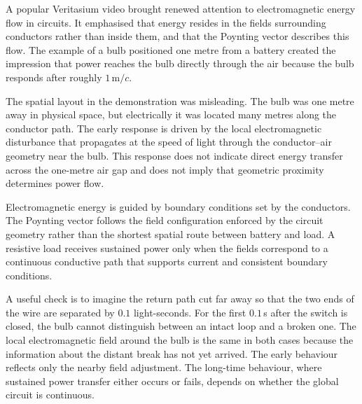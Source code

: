 \begin{commentary}
A popular Veritasium video brought renewed attention to electromagnetic energy flow in circuits. It emphasised that energy resides in the fields surrounding conductors rather than inside them, and that the Poynting vector describes this flow. The example of a bulb positioned one metre from a battery created the impression that power reaches the bulb directly through the air because the bulb responds after roughly $1\,\mathrm{m}/c$.

The spatial layout in the demonstration was misleading. The bulb was one metre away in physical space, but electrically it was located many metres along the conductor path. The early response is driven by the local electromagnetic disturbance that propagates at the speed of light through the conductor–air geometry near the bulb. This response does not indicate direct energy transfer across the one-metre air gap and does not imply that geometric proximity determines power flow.

Electromagnetic energy is guided by boundary conditions set by the conductors. The Poynting vector follows the field configuration enforced by the circuit geometry rather than the shortest spatial route between battery and load. A resistive load receives sustained power only when the fields correspond to a continuous conductive path that supports current and consistent boundary conditions.

A useful check is to imagine the return path cut far away so that the two ends of the wire are separated by $0.1$ light-seconds. For the first $0.1$\,s after the switch is closed, the bulb cannot distinguish between an intact loop and a broken one. The local electromagnetic field around the bulb is the same in both cases because the information about the distant break has not yet arrived. The early behaviour reflects only the nearby field adjustment. The long-time behaviour, where sustained power transfer either occurs or fails, depends on whether the global circuit is continuous.
\end{commentary}
    
    